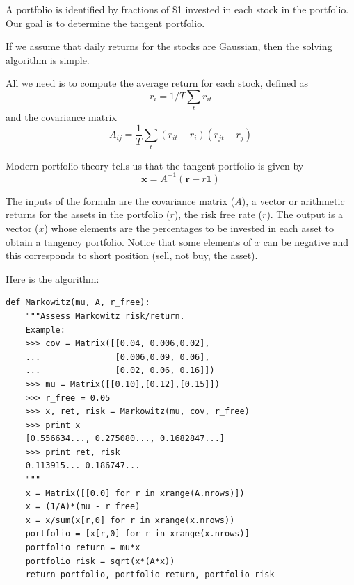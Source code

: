 \documentclass[justified,sixbynine]{tufte-book}
\def\ft{\small\tt}
\theoremstyle{plain}%
\theoremstyle{definition}
\theoremstyle{remark}
\begin{document}
\begin{fullwidth}
A portfolio is identified by fractions of \$1 invested in each stock in the portfolio. Our goal is to determine the tangent portfolio.

If we assume that daily returns for the stocks are Gaussian, then the solving algorithm is simple.

All we need is to compute the average return for each stock, defined as
\begin{equation}
r_i = 1/T \sum_t r_{it}
\end{equation}
and the covariance matrix
\begin{equation}
A_{ij} = \frac1T \sum_t (r_{it}-r_i)(r_{jt}-r_j)
\end{equation}

Modern portfolio theory tells us that the tangent portfolio is given by
\begin{equation}
\mathbf{x}=A^{-1} ( \mathbf{r}-\bar{r}\mathbf{1})
\end{equation}

The inputs of the formula are the covariance matrix ($A$), a vector or arithmetic returns for the assets in the portfolio ($r$), the risk free rate ($\bar{r}$). The output is a vector ($x$) whose elements are the percentages to be invested in each asset to obtain a tangency portfolio. Notice that some elements of $x$ can be negative and this corresponds to short position (sell, not buy, the asset).

Here is the algorithm:

\begin{lstlisting}[caption={in file: {\ft nlib.py}}]
def Markowitz(mu, A, r_free):
    """Assess Markowitz risk/return.
    Example:
    >>> cov = Matrix([[0.04, 0.006,0.02],
    ...               [0.006,0.09, 0.06],
    ...               [0.02, 0.06, 0.16]])
    >>> mu = Matrix([[0.10],[0.12],[0.15]])
    >>> r_free = 0.05
    >>> x, ret, risk = Markowitz(mu, cov, r_free)
    >>> print x
    [0.556634..., 0.275080..., 0.1682847...]
    >>> print ret, risk
    0.113915... 0.186747...
    """
    x = Matrix([[0.0] for r in xrange(A.nrows)])
    x = (1/A)*(mu - r_free)
    x = x/sum(x[r,0] for r in xrange(x.nrows))
    portfolio = [x[r,0] for r in xrange(x.nrows)]
    portfolio_return = mu*x
    portfolio_risk = sqrt(x*(A*x))
    return portfolio, portfolio_return, portfolio_risk
\end{lstlisting}


\end{fullwidth}
\end{document}
